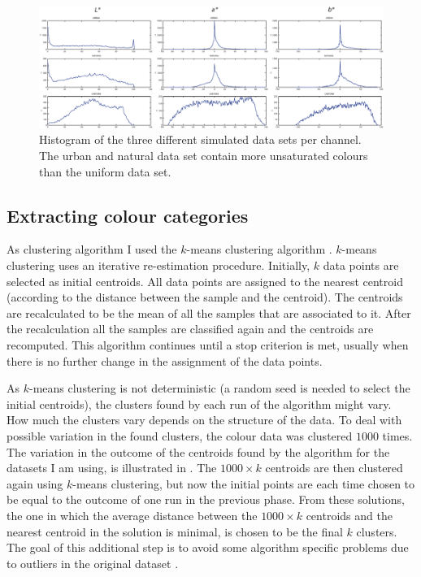 \begin{figure}[htbp]
\centering
\includegraphics[width=\textwidth]{./experiments/figures/data-sets-histogram.pdf}
\caption[Histogram of three different simulated data sets per
channel]{Histogram of the three different simulated data sets per
  channel. The urban and natural data set contain more unsaturated
  colours than the uniform data set.}
\label{f:data-sets-histogram}
\end{figure}

\subsection{Extracting colour categories}

As clustering algorithm I used the $k$-means clustering algorithm
\citep{lloyd82least}. $k$-means clustering uses an iterative
re-estimation procedure. Initially, $k$ data points are selected as
initial centroids. All data points are assigned to the nearest
centroid (according to the distance between the sample and the
centroid). The centroids are recalculated to be the mean of all the
samples that are associated to it.  After the recalculation all the
samples are classified again and the centroids are recomputed. This
algorithm continues until a stop criterion is met, usually when there
is no further change in the assignment of the data points.

As $k$-means clustering is not deterministic (a random seed is needed
to select the initial centroids), the clusters found by each run of
the algorithm might vary. How much the clusters vary depends on the
structure of the data. To deal with possible variation in the found
clusters, the colour data was clustered $1000$ times. The variation in
the outcome of the centroids found by the algorithm for the datasets I
am using, is illustrated in . The $1000
\times k$ centroids are then clustered again using $k$-means
clustering, but now the initial points are each time chosen to be
equal to the outcome of one run in the previous phase. From these
solutions, the one in which the average distance between the $1000
\times k$ centroids and the nearest centroid in the solution is
minimal, is chosen to be the final $k$ clusters. The goal of this
additional step is to avoid some algorithm specific problems due to
outliers in the original dataset \citep{bradley98refining}.


